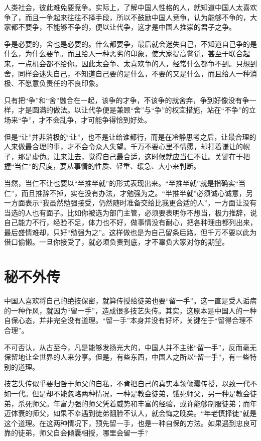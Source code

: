 \documentclass[fontset=fandol, a4paper, 12pt, openright]{ctexbook}
\begin{document}
人类社会，彼此难免要竞争。实际上，了解中国人性格的人，就知道中国人太喜欢争了，而且一争起来往往不择手段，所以不鼓励中国人竞争，认为能够不争的，大家都不要争，不能够不争的，便以让代争，这才是中国人推崇的君子之争。

争是必要的，舍也是必要的。什么都要争，最后就会迷失自己，不知道自己争的是什么，为什么要争。而且给人一种恶劣的印象，使大家提高警觉，甚至于联合起来，一点机会都不给你。因此太会争、太喜欢争的人，经常什么都争不到。只想到舍，同样会迷失自己，不知道自己要的是什么，不要的又是什么，而且给人一种消极、不愿意负责任的不良印象。

只有把“争”和“舍”融合在一起，该争的才争，不该争的就舍弃，争到好像没有争一样，才是圆满的做法。以让代争便是兼顾“舍”与“争”的权宜措施，站在“不争”的立场来“争”，才不会乱争，才可能争得恰到好处。

但是“让”并非消极的“让”，也不是让给谁都行，而是在冷静思考之后，让最合理的人来做最合理的事，才不会令众人失望。千万不要心里不情愿，却打着谦让的幌子，那是虚伪。让来让去，觉得自己最合适，这时候就应当仁不让。关键在于把握“当仁”的尺度，要从事情的性质、轻重、缓急、大小来判断。

当然，当仁不让也要以“半推半就”的形式表现出来。“半推半就”就是指确实“当仁”，而且推辞不掉，实在没有办法，才勉强为之。“半推半就”必须诚心诚意，另一方面表示“我虽然勉强接受，仍然随时准备交给比我更合适的人”，一方面让没有当选的人也有面子。比如你被选为部门主管，必须要表明你不想当，极力推辞，说自己能力不行，经验不足，体力也不好，做事情没有耐心，把各种理由都列出来，最后盛情难却，只好“勉强为之”。这样做也是为自己留条后路，但千万不要以此为借口偷懒。一旦你接受了，就必须负责到底，才不辜负大家对你的期望。

\section{秘不外传}

中国人喜欢将自己的绝技保密，就算传授给徒弟也要“留一手”。这一直是受人诟病的一种作风，就因为“留一手”，造成很多技艺失传。其实，这原本是中国人的一种自保心态，并非完全没有道理。“留一手”本身并没有好坏，关键在于“留得合理不合理”。

不可否认，从古至今，凡是能够发扬光大的，中国人并不主张“留一手”，反而毫无保留地让全世界的人来分享。但是，有些东西，中国人之所以“留一手”，有一些特别的道理。

技艺失传似乎要归咎于师父的自私，不肯把自己的真实本领倾囊传授，以致一代不如一代。但是却不能忽略两种情况，一种是教会徒弟，饿死师父，另一种是教会徒弟，杀死师父。年富力强的师父凭着威势和丰富的经验，或许能够制服徒弟；而年迈体衰的师父，如果不幸遇到徒弟翻脸不认人，就会悔之晚矣。“年老慎择徒”就是这个道理。在这两种情况下，预先留一手，也是一种自保的方法。如果遇到忠良可靠的徒弟，师父自会倾囊相授，哪里会留一手?
\end{document}
